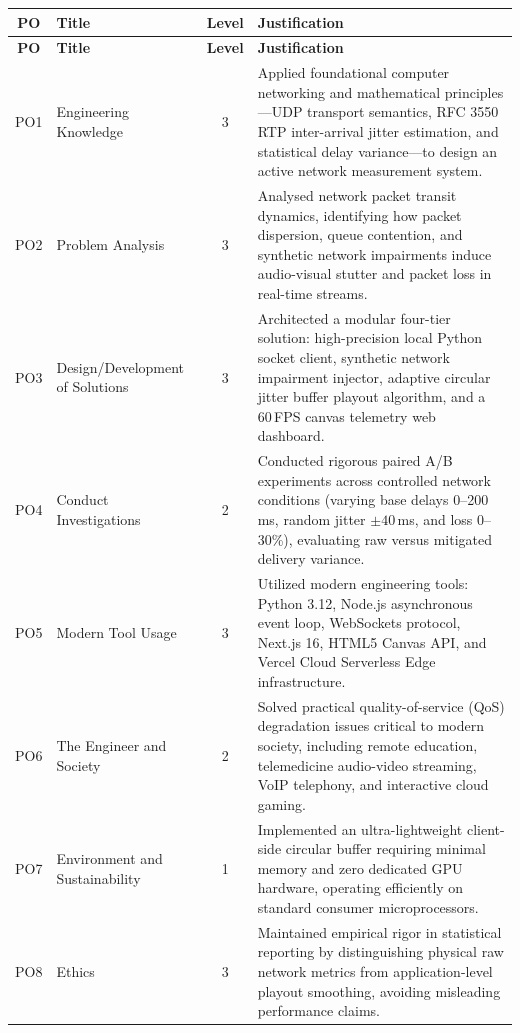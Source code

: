 \documentclass[12pt, a4paper]{report}
\begin{document}
\begin{xltabular}{\textwidth}{|c|p{2.8cm}|c|L|}
\hline
\textbf{PO} & \textbf{Title} & \textbf{Level} & \textbf{Justification} \\
\hline
\endfirsthead
\hline
\textbf{PO} & \textbf{Title} & \textbf{Level} & \textbf{Justification} \\
\hline
\endhead

PO1 & Engineering Knowledge & 3 & Applied foundational computer networking and mathematical principles---UDP transport semantics, RFC 3550 RTP inter-arrival jitter estimation, and statistical delay variance---to design an active network measurement system. \\
\hline
PO2 & Problem Analysis & 3 & Analysed network packet transit dynamics, identifying how packet dispersion, queue contention, and synthetic network impairments induce audio-visual stutter and packet loss in real-time streams. \\
\hline
PO3 & Design/Development of Solutions & 3 & Architected a modular four-tier solution: high-precision local Python socket client, synthetic network impairment injector, adaptive circular jitter buffer playout algorithm, and a 60\,FPS canvas telemetry web dashboard. \\
\hline
PO4 & Conduct Investigations & 2 & Conducted rigorous paired A/B experiments across controlled network conditions (varying base delays 0--200\,ms, random jitter $\pm 40$\,ms, and loss 0--30\%), evaluating raw versus mitigated delivery variance. \\
\hline
PO5 & Modern Tool Usage & 3 & Utilized modern engineering tools: Python 3.12, Node.js asynchronous event loop, WebSockets protocol, Next.js 16, HTML5 Canvas API, and Vercel Cloud Serverless Edge infrastructure. \\
\hline
PO6 & The Engineer and Society & 2 & Solved practical quality-of-service (QoS) degradation issues critical to modern society, including remote education, telemedicine audio-video streaming, VoIP telephony, and interactive cloud gaming. \\
\hline
PO7 & Environment and Sustainability & 1 & Implemented an ultra-lightweight client-side circular buffer requiring minimal memory and zero dedicated GPU hardware, operating efficiently on standard consumer microprocessors. \\
\hline
PO8 & Ethics & 3 & Maintained empirical rigor in statistical reporting by distinguishing physical raw network metrics from application-level playout smoothing, avoiding misleading performance claims. \\

\end{xltabular}
\end{document}
